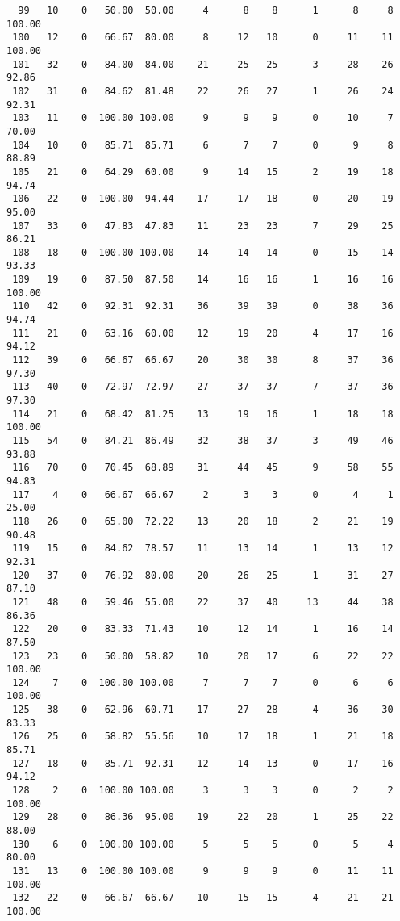\begin{verbatim}
  99   10    0   50.00  50.00     4      8    8      1      8     8   100.00
 100   12    0   66.67  80.00     8     12   10      0     11    11   100.00
 101   32    0   84.00  84.00    21     25   25      3     28    26    92.86
 102   31    0   84.62  81.48    22     26   27      1     26    24    92.31
 103   11    0  100.00 100.00     9      9    9      0     10     7    70.00
 104   10    0   85.71  85.71     6      7    7      0      9     8    88.89
 105   21    0   64.29  60.00     9     14   15      2     19    18    94.74
 106   22    0  100.00  94.44    17     17   18      0     20    19    95.00
 107   33    0   47.83  47.83    11     23   23      7     29    25    86.21
 108   18    0  100.00 100.00    14     14   14      0     15    14    93.33
 109   19    0   87.50  87.50    14     16   16      1     16    16   100.00
 110   42    0   92.31  92.31    36     39   39      0     38    36    94.74
 111   21    0   63.16  60.00    12     19   20      4     17    16    94.12
 112   39    0   66.67  66.67    20     30   30      8     37    36    97.30
 113   40    0   72.97  72.97    27     37   37      7     37    36    97.30
 114   21    0   68.42  81.25    13     19   16      1     18    18   100.00
 115   54    0   84.21  86.49    32     38   37      3     49    46    93.88
 116   70    0   70.45  68.89    31     44   45      9     58    55    94.83
 117    4    0   66.67  66.67     2      3    3      0      4     1    25.00
 118   26    0   65.00  72.22    13     20   18      2     21    19    90.48
 119   15    0   84.62  78.57    11     13   14      1     13    12    92.31
 120   37    0   76.92  80.00    20     26   25      1     31    27    87.10
 121   48    0   59.46  55.00    22     37   40     13     44    38    86.36
 122   20    0   83.33  71.43    10     12   14      1     16    14    87.50
 123   23    0   50.00  58.82    10     20   17      6     22    22   100.00
 124    7    0  100.00 100.00     7      7    7      0      6     6   100.00
 125   38    0   62.96  60.71    17     27   28      4     36    30    83.33
 126   25    0   58.82  55.56    10     17   18      1     21    18    85.71
 127   18    0   85.71  92.31    12     14   13      0     17    16    94.12
 128    2    0  100.00 100.00     3      3    3      0      2     2   100.00
 129   28    0   86.36  95.00    19     22   20      1     25    22    88.00
 130    6    0  100.00 100.00     5      5    5      0      5     4    80.00
 131   13    0  100.00 100.00     9      9    9      0     11    11   100.00
 132   22    0   66.67  66.67    10     15   15      4     21    21   100.00

\end{verbatim}
